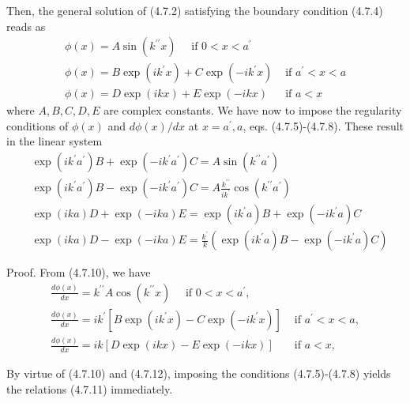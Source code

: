\documentclass{article}
\begin{document}
Then, the general solution of (4.7.2) satisfying the boundary condition (4.7.4) reads as
$$
\begin{array}{ll}
\phi(x)=A \sin \left(k^{\prime \prime} x\right) \quad \text { if } 0<x<a^{\prime} \\
\phi(x)=B \exp \left(i k^{\prime} x\right)+C \exp \left(-i k^{\prime} x\right) & \text { if } a^{\prime}<x<a \\
\phi(x)=D \exp (i k x)+E \exp (-i k x) & \text { if } a<x \tag{4.7.10c}
\end{array}
$$
where $A, B, C, D, E$ are complex constants. We have now to impose the regularity conditions of $\phi(x)$ and $d \phi(x) / d x$ at $x=a^{\prime}, a$, eqs. (4.7.5)-(4.7.8). These result in the linear system
$$
\begin{align*}
& \exp \left(i k^{\prime} a^{\prime}\right) B+\exp \left(-i k^{\prime} a^{\prime}\right) C=A \sin \left(k^{\prime \prime} a^{\prime}\right)  \tag{4.7.11a}\\
& \exp \left(i k^{\prime} a^{\prime}\right) B-\exp \left(-i k^{\prime} a^{\prime}\right) C=A \frac{k^{\prime \prime}}{i k^{\prime}} \cos \left(k^{\prime \prime} a^{\prime}\right)  \tag{4.7.11b}\\
& \exp (i k a) D+\exp (-i k a) E=\exp \left(i k^{\prime} a\right) B+\exp \left(-i k^{\prime} a\right) C  \tag{4.7.11c}\\
& \exp (i k a) D-\exp (-i k a) E=\frac{k^{\prime}}{k}\left(\exp \left(i k^{\prime} a\right) B-\exp \left(-i k^{\prime} a\right) C\right) \tag{4.7.11d}
\end{align*}
$$

Proof. From (4.7.10), we have
$$
\begin{array}{ll}
\frac{d \phi(x)}{d x}=k^{\prime \prime} A \cos \left(k^{\prime \prime} x\right) \quad \text { if } 0<x<a^{\prime}, & \\
\frac{d \phi(x)}{d x}=i k^{\prime}\left[B \exp \left(i k^{\prime} x\right)-C \exp \left(-i k^{\prime} x\right)\right] & \text { if } a^{\prime}<x<a, \\
\frac{d \phi(x)}{d x}=i k[D \exp (i k x)-E \exp (-i k x)] & \text { if } a<x, \tag{4.7.12c}
\end{array}
$$

By virtue of (4.7.10) and (4.7.12), imposing the conditions (4.7.5)-(4.7.8) yields the relations (4.7.11) immediately.
\end{document}

